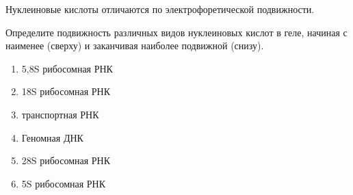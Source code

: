 
Нуклеиновые кислоты отличаются по электрофоретической подвижности.

Определите подвижность различных видов нуклеиновых кислот в геле, начиная с наименее (сверху) и заканчивая наиболее подвижной (снизу).

\begin{enumerate}
    \item 5,8S рибосомная РНК
    \item 18S рибосомная РНК
    \item транспортная РНК
    \item Геномная ДНК
    \item 28S рибосомная РНК
    \item 5S рибосомная РНК
\end{enumerate}